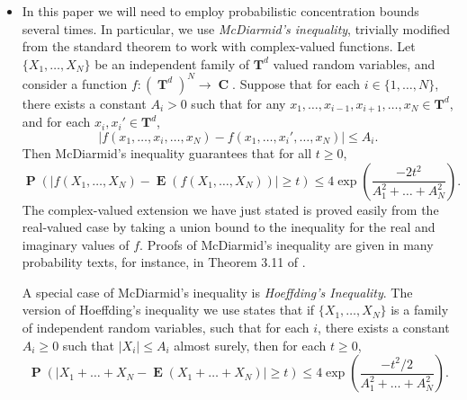 \documentclass[dvipsnames,letterpaper,12pt]{article}
\numberwithin{equation}{section}
\DeclareMathOperator{\TT}{\mathbf{T}}
\DeclareMathOperator{\CC}{\mathbf{C}}
\numberwithin{theorem}{section}
\DeclareMathOperator{\EE}{\mathbf{E}}
\DeclareMathOperator{\PP}{\mathbf{P}}
\newcommand{\psitwo}[1]{\| {#1} \|_{\psi_2(L)}}
\begin{document}
\begin{itemize}
    \item In this paper we will need to employ probabilistic concentration bounds several times. In particular, we use \emph{McDiarmid's inequality}, trivially modified from the standard theorem to work with complex-valued functions. Let $\{ X_1, \dots, X_N \}$ be an independent family of $\mathbf{T}^d$ valued random variables, and consider a function $f: (\TT^d)^N \to \CC$. Suppose that for each $i \in \{ 1, \dots, N \}$, there exists a constant $A_i > 0$ such that for any $x_1, \dots, x_{i-1}, x_{i+1}, \dots, x_N \in \mathbf{T}^d$, and for each $x_i, x_i' \in \mathbf{T}^d$,
    \[ |f(x_1, \dots, x_i, \dots, x_N) - f(x_1, \dots, x_i', \dots, x_N)| \leq A_i. \]
    Then McDiarmid's inequality guarantees that for all $t \geq 0$,
    \[ \PP \left( |f(X_1, \dots, X_N) - \EE(f(X_1, \dots, X_N))| \geq t \right) \leq 4 \exp \left( \frac{-2t^2}{A_1^2 + \dots + A_N^2} \right). \]
    The complex-valued extension we have just stated is proved easily from the real-valued case by taking a union bound to the inequality for the real and imaginary values of $f$. Proofs of McDiarmid's inequality are given in many probability texts, for instance, in Theorem 3.11 of \cite{VanHandel}.

    A special case of McDiarmid's inequality is \emph{Hoeffding's Inequality}. The version of Hoeffding's inequality we use states that if $\{ X_1, \dots, X_N \}$ is a family of independent random variables, such that for each $i$, there exists a constant $A_i \geq 0$ such that $|X_i| \leq A_i$ almost surely, then for each $t \geq 0$,
    \[ \PP \left( |X_1 + \dots + X_N - \EE(X_1 + \dots + X_N)| \geq t \right) \leq 4 \exp \left(\frac{-t^2/2}{A_1^2 + \dots + A_N^2} \right). \]

    \begin{comment}

    \item Our random construction involves a probabilistic concentration of measure argument. Define a convex function $\psi_2: [0,\infty) \to [0,\infty)$ by setting
    \[ \psi_2(t) = e^{t^2} - 1, \]
    The function $\psi_2$ induces an Orlicz norm on the family of scalar valued random variables over a probability space by setting, for each random variable $X$,
    \[ \psitwo{X} = \inf \left\{ A \in (0,\infty) : \EE(\psi_2(|X|/A)) \leq 1 \right\}. \]
    The family of random variables with $\psitwo{X} < \infty$ are known as \emph{subgaussian random variables}. Here are the important properties of subgaussian random variables which we use in this paper:
    \begin{itemize}
        \item If $\psitwo{X} \leq A$, then for each $t \geq 0$,
        \[ \PP \left( |X| \geq t \right) \leq 10 \exp \left( -t^2/10A^2 \right). \]
        Thus Subgaussian random variables have Gaussian tails.


\end{comment}
\end{itemize}
\end{document}
